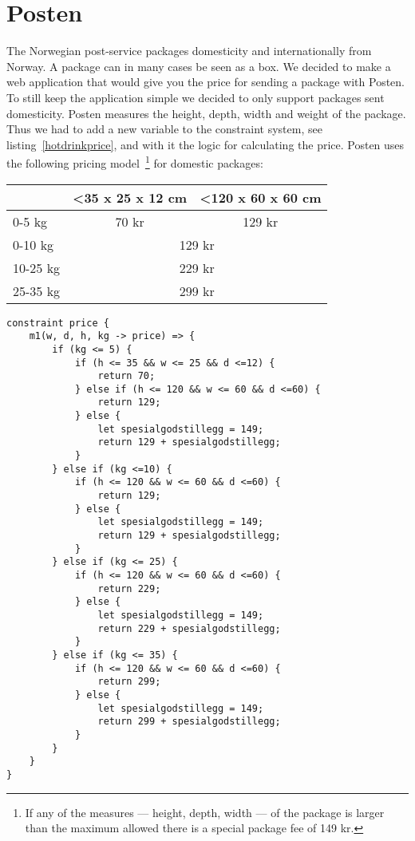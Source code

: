 \section{Posten}
The Norwegian post-service packages domesticity and internationally from Norway. 
A package can in many cases be seen as a box. We decided to make a web application 
that would give you the price for sending a package with Posten. To still keep the 
application simple we decided to only support packages sent domesticity. Posten 
measures the height, depth, width and weight of the package. Thus we had to add a new 
variable to the constraint system, see listing~\ref{hotdrinkprice}, and with it the logic for calculating the price. 
Posten uses the following pricing 
model~\cite{postenNorgespakken}\footnote{If any of the measures --- height, depth, width --- of the package is larger than the maximum allowed there is a special package fee of 149 kr.} 
for domestic packages:
\begin{table}[h]
    \centering
    \begin{tabular}{|l|cl|}
    \hline
             & \multicolumn{1}{l|}{\textless 35 x 25 x 12 cm} & \textless 120 x 60 x 60 cm  \\ \hline
    0-5 kg   & \multicolumn{1}{c|}{70 kr}                     & \multicolumn{1}{c|}{129 kr} \\ \hline
    0-10 kg  & \multicolumn{2}{c|}{129 kr}                                                  \\ \hline
    10-25 kg & \multicolumn{2}{c|}{229 kr}                                                  \\ \hline
    25-35 kg & \multicolumn{2}{c|}{299 kr}                                                  \\ \hline
    \end{tabular}
\end{table}

\begin{lstlisting}[caption={HotDrink logic for determining the price},label=hotdrinkprice, language=hotdrink]
constraint price {
    m1(w, d, h, kg -> price) => {
        if (kg <= 5) {
            if (h <= 35 && w <= 25 && d <=12) {
                return 70;
            } else if (h <= 120 && w <= 60 && d <=60) {
                return 129;
            } else {
                let spesialgodstillegg = 149;
                return 129 + spesialgodstillegg;
            }
        } else if (kg <=10) {
            if (h <= 120 && w <= 60 && d <=60) {
                return 129;
            } else {
                let spesialgodstillegg = 149;
                return 129 + spesialgodstillegg;
            }
        } else if (kg <= 25) {
            if (h <= 120 && w <= 60 && d <=60) {
                return 229;
            } else {
                let spesialgodstillegg = 149;
                return 229 + spesialgodstillegg;
            }
        } else if (kg <= 35) {
            if (h <= 120 && w <= 60 && d <=60) {
                return 299;
            } else {
                let spesialgodstillegg = 149;
                return 299 + spesialgodstillegg;
            }
        }
    }
}
\end{lstlisting}
